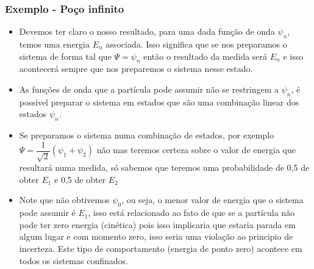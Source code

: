 \documentclass[12pt,brazil,table]{beamer}
\begin{document}
\begin{frame}
  \frametitle{Exemplo - Poço infinito}  
  \fontsize{9pt}{11pt}\selectfont
  
  \begin{itemize}
   \item Devemos ter claro o nosso resultado, para uma dada função de onda $\psi_n$, temos uma energia $E_n$ associada. Isso significa que se nos preparamos o sistema de forma tal que $\Psi = \psi_n$ então o resultado da medida será $E_n$ e isso acontecerá sempre que nos preparemos o sistema nesse estado.
   \item As funções de onda que a partícula pode assumir não se restringem a $\psi_n$, é possível preparar o sistema em estados que são uma combinação linear dos estados $\psi_n$.
   \item  Se preparamos o sistema numa combinação de estados, por exemplo  $\Psi = \dfrac{1}{\sqrt{2}}\left( \psi_1 + \psi_2\right)$ não mas teremos certeza sobre o valor de energia que resultará numa medida, só sabemos que teremos uma probabilidade de 0,5 de obter $E_1$ e 0,5 de obter $E_2$
   \item Note que não obtivemos $\psi_0$, ou seja, o menor valor de energia que o sistema pode assumir é $E_1$, isso está relacionado ao fato de que se a partícula não pode ter zero energia (cinética) pois isso implicaria que estaria parada em algum lugar e com momento zero, isso seria uma violação ao principio de incerteza. Este tipo de comportamento (energia de ponto zero) acontece em todos os sistemas confinados.
  \end{itemize}
  
\end{frame}



\end{document}
